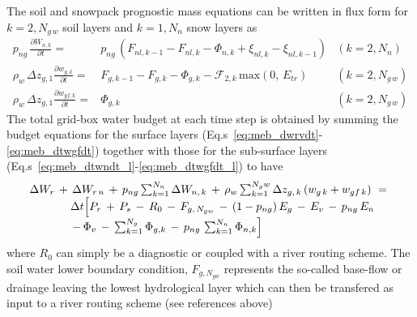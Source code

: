 {The soil and snowpack prognostic mass equations can be
written in flux form for $k=2,N_{g\,w}$ soil layers and $k=1,N_n$ snow layers as
%
\begin{align}
%
\label{eq:meb_dtwndt_l}
p_{ng} \, {\frac {\partial W_{n,k}}{\partial t}} = & 
p_{ng} \, \left(
F_{nl,k-1} - F_{nl,k} 
- \Phi_{n,k}
+ \xi_{nl,k} - \xi_{nl,k-1} 
\right)
&
\left(k=2,N_n\right)
\\
%
\label{eq:meb_dtwgdt_l} 
\rho_w \, \Delta z_{g,1} {\frac {\partial w_{g,k}}{\partial t}} = & 
F_{g,k-1} - F_{g,k} - \Phi_{g,k}
- {\mathcal F}_{2,k}\, {\mathrm{max}}\left(0, \, E_{tr}\right) &
\left(k=2,N_{g\,w}\right)
\\
%
\label{eq:meb_dtwgfdt_l}
\rho_w \, \Delta z_{g,1} {\frac {\partial w_{gf,k}}{\partial t}} = &
\Phi_{g,k}
&
\left(k=2,N_{g\,w}\right)
%
\end{align}
%
The total grid-box water budget at each time step is obtained by
summing the budget equations for the surface layers
(Eq.s~\ref{eq:meb_dwrvdt}-\ref{eq:meb_dtwgfdt})
together with those for the sub-surface layers
(Eq.s~\ref{eq:meb_dtwndt_l}-\ref{eq:meb_dtwgfdt_l})
to have
%
\begin{align}
\begin{array}{ll}
%
\label{eq:meb_water_budget}
%
\Delta W_{r} \,+\, 
\Delta W_{r\,n} \,+\, 
p_{ng} \sum_{k=1}^{N_n} \Delta W_{n,\,k} \,+\, 
\rho_w \sum_{k=1}^{N_gw} \Delta z_{g,\,k} \left( w_{g\,k} + w_{gf\,k}
\right) \,\, = \,\, \\ 
\hskip.5in
\Delta t \Big\lbrack
P_r \,+\, P_s \,-\, R_0 \,-\, F_{g,\,N_{gw}} 
\,-\, \left(1-p_{ng}\right) E_g \,-\, E_{v} \,-\, p_{ng}\,E_n
%
\\
\hskip.5in
\,-\, \Phi_{v} 
\,-\, \sum_{k=1}^{N_g} \Phi_{g,k} 
\,-\, p_{ng}\, \sum_{k=1}^{N_n} \Phi_{n,k} 
%
\Big\rbrack
%
\end{array}
\end{align}
%
where $R_0$ can simply be a diagnostic or coupled with 
a river routing scheme. 
%
The soil water lower boundary condition, $F_{g,N_{gw}}$
represents the so-called base-flow or drainage
leaving the lowest hydrological layer which can then be transfered
as input to a river routing scheme (see references above)
}

